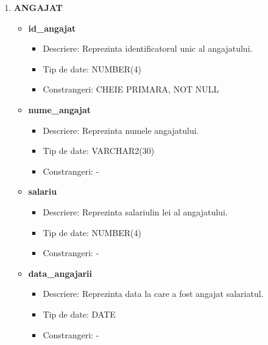 \begin{enumerate}
\begin{itemize}
    \end{itemize}

    \vspace{0.5cm}

    \item \textbf{ANGAJAT}
    \begin{itemize}
    
        \item \textbf{id\_angajat}
                \begin{itemize}
                    \item Descriere: Reprezinta identificatorul unic al angajatului.
                    \item Tip de date: NUMBER(4)
                    \item Constrangeri: CHEIE PRIMARA, NOT NULL
                \end{itemize}

        \item \textbf{nume\_angajat}
                \begin{itemize}
                    \item Descriere: Reprezinta numele angajatului.
                    \item Tip de date: VARCHAR2(30)
                    \item Constrangeri: -
                \end{itemize}

        \item \textbf{salariu}
                \begin{itemize}
                    \item Descriere: Reprezinta salariulin lei al angajatului.
                    \item Tip de date: NUMBER(4)
                    \item Constrangeri: -
                \end{itemize}
                
       \item \textbf{data\_angajarii}
                \begin{itemize}
                    \item Descriere: Reprezinta data la care a fost angajat salariatul.
                    \item Tip de date: DATE
                    \item Constrangeri: -
                \end{itemize}


\end{itemize}
\end{enumerate}
